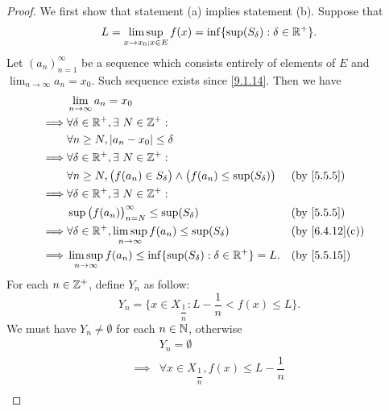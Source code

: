 \begin{proof}
  We first show that statement (a) implies statement (b).
  Suppose that
  \[
    L = \limsup_{x \to x_0 ; x \in E} f(x) = \inf\{\sup(S_\delta) : \delta \in \mathbb{R}^+\}.
  \]
  Let \((a_n)_{n = 1}^\infty\) be a sequence which consists entirely of elements of \(E\) and \(\lim_{n \to \infty} a_n = x_0\).
  Such sequence exists since \cref{9.1.14}.
  Then we have
  \begin{align*}
             & \lim_{n \to \infty} a_n = x_0                                                                                                    \\
    \implies & \forall \delta \in \R^+, \exists\ N \in \Z^+ :                                                                                   \\
             & \forall n \geq N, \abs{a_n - x_0} \leq \delta                                                                                    \\
    \implies & \forall \delta \in \R^+, \exists\ N \in \Z^+ :                                                                                   \\
             & \forall n \geq N, \big(f(a_n) \in S_{\delta}\big) \land \big(f(a_n) \leq \sup(S_{\delta})\big) &  & \by{5.5.5}                   \\
    \implies & \forall \delta \in \R^+, \exists\ N \in \Z^+ :                                                                                   \\
             & \sup\big(f(a_n)\big)_{n = N}^\infty \leq \sup(S_{\delta})                                      &  & \by{5.5.5}                   \\
    \implies & \forall \delta \in \R^+, \limsup_{n \to \infty} f(a_n) \leq \sup(S_{\delta})                   &  & \text{(by \cref{6.4.12}(c))} \\
    \implies & \limsup_{n \to \infty} f(a_n) \leq \inf\{\sup(S_{\delta}) : \delta \in \R^+\} = L.             &  & \text{(by \cref{5.5.15})}
  \end{align*}
  For each \(n \in \mathbb{Z}^+\), define \(Y_n\) as follow:
  \[
    Y_n = \{x \in X_{\dfrac{1}{n}} : L - \dfrac{1}{n} < f(x) \leq L\}.
  \]
  We must have \(Y_n \neq \emptyset\) for each \(n \in \mathbb{N}\), otherwise
  \begin{align*}
             & Y_n = \emptyset                                                                                   \\
    \implies & \forall x \in X_{\dfrac{1}{n}}, f(x) \leq L - \dfrac{1}{n}                                        \\

\end{align*}
\end{proof}
